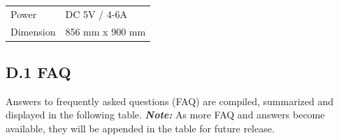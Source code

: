 \begin{longtable}[]{@{}ll@{}}
\begin{minipage}[t]{0.29\columnwidth}\raggedright
Power\strut
\end{minipage} & \begin{minipage}[t]{0.65\columnwidth}\raggedright
DC 5V / 4-6A\strut
\end{minipage}\tabularnewline
\begin{minipage}[t]{0.29\columnwidth}\raggedright
Dimension\strut
\end{minipage} & \begin{minipage}[t]{0.65\columnwidth}\raggedright
856 mm x 900 mm\strut
\end{minipage}\tabularnewline
\bottomrule
\end{longtable}


\subsection{D.1 FAQ}

Answers to frequently asked questions (FAQ) are compiled, summarized and
displayed in the following table. \textbf{\emph{Note:}} As more FAQ and
answers become available, they will be appended in the table for future
release.

